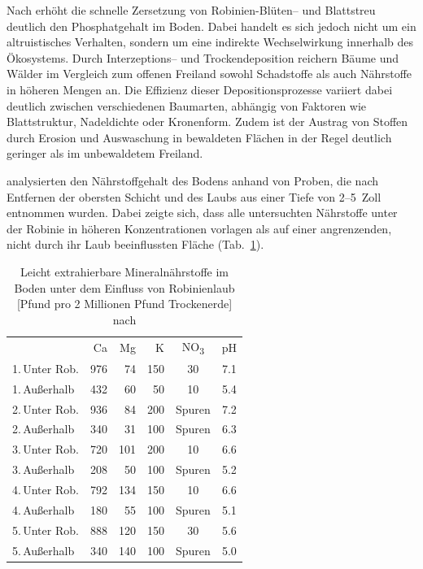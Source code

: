 \documentclass[twocolumn]{scrartcl}
\begin{document}
Nach \citet{lee2010robinie} erhöht die schnelle Zersetzung von Robinien-Blüten-- und Blattstreu deutlich den Phosphatgehalt im Boden. Dabei handelt es sich jedoch nicht um ein altruistisches Verhalten, sondern um eine indirekte Wechselwirkung innerhalb des Ökosystems. Durch Interzeptions-- und Trockendeposition reichern Bäume und Wälder im Vergleich zum offenen Freiland sowohl Schadstoffe als auch Nährstoffe in höheren Mengen an. Die Effizienz dieser Depositionsprozesse variiert dabei deutlich zwischen verschiedenen Baumarten, abhängig von Faktoren wie Blattstruktur, Nadeldichte oder Kronenform. Zudem ist der Austrag von Stoffen durch Erosion und Auswaschung in bewaldeten Flächen in der Regel deutlich geringer als im unbewaldetem Freiland.

\citet{garman1938robinie} analysierten den Nährstoffgehalt des Bodens anhand von Proben, die nach Entfernen der obersten Schicht und des Laubs aus einer Tiefe von 2--5~Zoll entnommen wurden. Dabei zeigte sich, dass alle untersuchten Nährstoffe unter der Robinie in höheren Konzentrationen vorlagen als auf einer angrenzenden, nicht durch ihr Laub beeinflussten Fläche (Tab.~\ref{tab:naehrstoffeUnterRob}).

\begin{table}[htbp]
  \centering
  \begin{tabular}{lrrrcc}
           & Ca & Mg & K & NO\textsubscript{3} & pH \\
 1.\,Unter Rob. & 976 & 74  & 150  & 30   & 7.1 \\
 1.\,Außerhalb  & 432 & 60  &  50  & 10   & 5.4 \\[.3em]
 2.\,Unter Rob. & 936 & 84  & 200  & Spuren & 7.2 \\
 2.\,Außerhalb  & 340 & 31  & 100  & Spuren & 6.3 \\[.3em]
 3.\,Unter Rob. & 720 & 101 & 200  & 10   & 6.6 \\
 3.\,Außerhalb  & 208 & 50  & 100  & Spuren & 5.2 \\[.3em]
 4.\,Unter Rob. & 792 & 134 & 150  & 10   & 6.6 \\
 4.\,Außerhalb  & 180 & 55  & 100  & Spuren & 5.1 \\[.3em]
 5.\,Unter Rob. & 888 & 120 & 150  & 30   & 5.6 \\
 5.\,Außerhalb  & 340 & 140 & 100  & Spuren & 5.0 \\
  \end{tabular}
  \caption{Leicht extrahierbare Mineralnährstoffe im Boden unter dem Einfluss von Robinienlaub [Pfund pro 2 Millionen Pfund Trockenerde] nach \citet{garman1938robinie}}
  \label{tab:naehrstoffeUnterRob}
\end{table}
\end{document}
